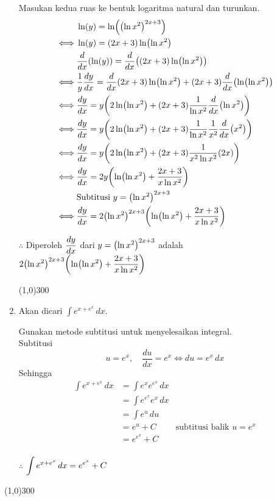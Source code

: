\begin{enumerate}[leftmargin=*, label={\arabic*}.]
Masukan kedua ruas ke bentuk logaritma natural dan turunkan.
\begin{align*}
    &\ln(y) = \ln\brk*{\brk*{\ln x^{2}}^{2x+3}}\\
    \iff &\ln(y) = (2x+3)\ln\brk*{\ln x^{2}}\\
    &\drv{x}{\ln(y)} = \drv{x}{(2x+3)\ln\brk*{\ln x^{2}}}\\
    \iff &\frac{1}{y}\frac{dy}{dx} = 
    \drv{x}{2x+3}\ln\brk*{\ln x^{2}}+(2x+3)\drv{x}{\ln\brk*{\ln x^{2}}}\\
    \iff &\frac{dy}{dx} = y\brk*{2\ln\brk*{\ln x^{2}}
    +(2x+3)\frac{1}{\ln x^{2}}\drv{x}{\ln x^{2}}}\\
    \iff &\frac{dy}{dx} = y\brk*{2\ln\brk*{\ln x^{2}}
    +(2x+3)\frac{1}{\ln x^{2}}\frac{1}{x^{2}}\drv{x}{x^{2}}}\\
    \iff &\frac{dy}{dx} = y\brk*{2\ln\brk*{\ln x^{2}}
    +(2x+3)\frac{1}{x^{2}\ln x^{2}}(2x)}\\
    \iff &\frac{dy}{dx} = 2y\brk*{\ln\brk*{\ln x^{2}}+\frac{2x+3}{x\ln x^{2}}}\\
    &\text{Subtitusi $y=\brk*{\ln x^{2}}^{2x+3}$}\\
    \iff &\frac{dy}{dx} = 2\brk*{\ln x^{2}}^{2x+3}
    \brk*{\ln\brk*{\ln x^{2}}+\frac{2x+3}{x\ln x^{2}}}
\end{align*}

$\therefore$ Diperoleh $\ds \frac{dy}{dx}$ dari $y=\brk*{\ln x^{2}}^{2x+3}$ adalah 
$\ds 2\brk*{\ln x^{2}}^{2x+3}\brk*{\ln\brk*{\ln x^{2}}+\frac{2x+3}{x\ln x^{2}}}$


\begin{center}\line(1,0){300}\end{center}


\item Akan dicari $\int e^{x+e^{x}}\,dx$.

Gunakan metode subtitusi untuk menyelesaikan integral.\\
Subtitusi
    \[
        u = e^{x},\quad \frac{du}{dx} = e^{x} \iff du = e^{x}\,dx
    \]
Sehingga 
\begin{align*}
    \int e^{x+e^{x}}\,dx
    &= \int e^{x}e^{e^{x}}\,dx\\
    &= \int e^{e^{x}}e^{x}\,dx\\
    &= \int e^{u}\,du\\
    &= e^{u} + C &\text{subtitusi balik $u = e^{x}$}\\
    &= e^{e^{x}} + C\\
\end{align*}
    
$\therefore$ $\ds \int e^{x+e^{x}}\,dx = e^{e^{x}} + C$

\end{enumerate}

\begin{center}\line(1,0){300}\end{center}
